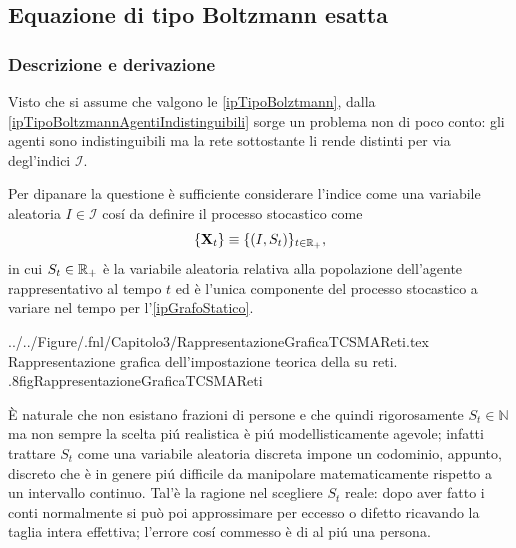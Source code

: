         \subsection{Equazione di tipo Boltzmann esatta}\label{secTipoBoltzmannUrbano}
            
            \subsubsection{Descrizione e derivazione}

                Visto che si assume che valgono le \cref{ipTipoBolztmann}\footnotemark{}, dalla \ref{ipTipoBoltzmannAgentiIndistinguibili} sorge un problema non di poco conto: gli agenti sono indistinguibili ma la rete sottostante li rende distinti per via degl'indici \(\mathcal I\).%

                Per dipanare la questione è sufficiente considerare l'indice come una variabile aleatoria \(I\in\mathcal I\) cosí da definire il processo stocastico come
                \begin{equation*}
                    \{\mathbf X_t\}\equiv\{(I,S_t)\}_{t\in\mathbb R_+},
                \end{equation*}
                in cui \(S_t\in\mathbb R_+\) è la variabile aleatoria relativa alla popolazione dell'agente rappresentativo al tempo \(t\) ed è l'unica componente del processo stocastico a variare nel tempo per l'\cref{ipGrafoStatico}.

                    {../../Figure/.fnl/Capitolo3/RappresentazioneGraficaTCSMAReti.tex}
                    {Rappresentazione grafica dell'impostazione teorica della \protect\TCSMA{} su reti.}
                    {.8\linewidth}{figRappresentazioneGraficaTCSMAReti}

                \begin{oss}
                    \label{ossNaturaNumericaPopolazione}
                    È naturale che non esistano frazioni di persone e che quindi rigorosamente \(S_t\in\mathbb N\) ma non sempre la scelta piú realistica è piú modellisticamente agevole; infatti trattare \(S_t\) come una variabile aleatoria discreta impone un codominio, appunto, discreto che è in genere piú difficile da manipolare matematicamente rispetto a un intervallo continuo. Tal'è la ragione nel scegliere \(S_t\) reale: dopo aver fatto i conti normalmente si può poi approssimare per eccesso o difetto ricavando la taglia intera effettiva; l'errore cosí commesso è di al piú una persona.
                \end{oss}

